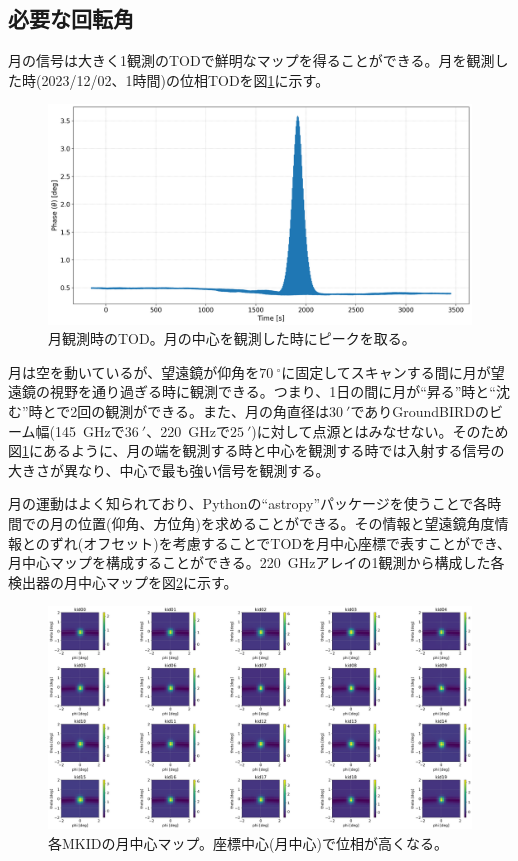 \subsection{必要な回転角}
\label{angle_calculation}
月の信号は大きく1観測のTODで鮮明なマップを得ることができる。月を観測した時(2023/12/02、1時間)の位相TODを図\ref{6550_kid0_phase}に示す。
\begin{figure}[htbp]
  \centering
  \includegraphics[width=0.95\columnwidth]{5_alignment/figs/6550_kid0_phase.png}
  \caption{月観測時のTOD。月の中心を観測した時にピークを取る。}
  \label{6550_kid0_phase}
\end{figure}
月は空を動いているが、望遠鏡が仰角を$\SI{70}{^{\circ}}$に固定してスキャンする間に月が望遠鏡の視野を通り過ぎる時に観測できる。つまり、1日の間に月が``昇る''時と``沈む''時とで2回の観測ができる。また、月の角直径は$\SI{30}{'}$でありGroundBIRDのビーム幅(\SI{145}{GHz}で$\SI{36}{'}$、\SI{220}{GHz}で$\SI{25}{'}$)に対して点源とはみなせない。そのため図\ref{6550_kid0_phase}にあるように、月の端を観測する時と中心を観測する時では入射する信号の大きさが異なり、中心で最も強い信号を観測する。

月の運動はよく知られており、Pythonの``astropy\cite{astropy}''パッケージを使うことで各時間での月の位置(仰角、方位角)を求めることができる。その情報と望遠鏡角度情報とのずれ(オフセット)を考慮することでTODを月中心座標で表すことができ、月中心マップを構成することができる。\SI{220}{GHz}アレイの1観測から構成した各検出器の月中心マップを図\ref{moon_centered_6550}に示す。
\begin{figure}[htbp]
  \centering
  \includegraphics[width=0.9\columnwidth]{5_alignment/figs/moon_centered_6550.png}
  \caption{各MKIDの月中心マップ。座標中心(月中心)で位相が高くなる。}
  \label{moon_centered_6550}
\end{figure}

